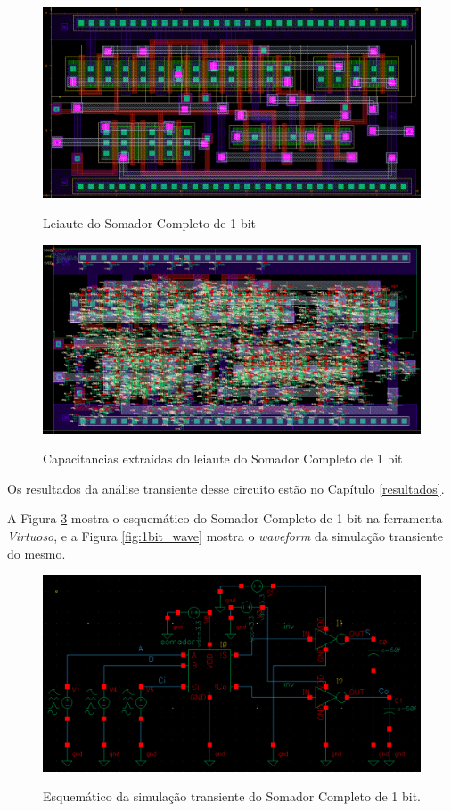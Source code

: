 \documentclass{iiufrgs}
\newcommand{\virtuoso}{\textit{Virtuoso}}
\begin{document}
\begin{figure}[htbp]
    \centering
    \caption{Leiaute do Somador Completo de 1 bit}
    \includegraphics[scale=0.35]{images/layout_1bit.png}
    \label{fig:1bit_leiaute}
\end{figure}

\begin{figure}[htbp]
    \centering
    \caption{Capacitancias extraídas do leiaute do Somador Completo de 1 bit}
    \includegraphics[scale=0.35]{images/extracted_1bit.png}
    \label{fig:1bit_capacitancias}
\end{figure}

\FloatBarrier

Os resultados da análise transiente desse circuito estão no Capítulo \ref{resultados}.

A Figura \ref{fig:1bit_trans} mostra o esquemático do Somador Completo de 1 bit na ferramenta \virtuoso, e a Figura \ref{fig:1bit_wave} mostra o \textit{waveform} da simulação transiente do mesmo.

\begin{figure}[htbp]
    \centering
    \caption{Esquemático da simulação transiente do Somador Completo de 1 bit.}
    \includegraphics[scale=0.45]{images/schem_1bit_trans.png}
    \label{fig:1bit_trans}
\end{figure}
\end{document}
